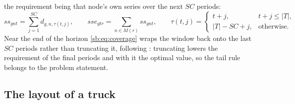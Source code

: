 the requirement being that node's own series over the next $SC$
periods:
\begin{equation}
ss_{gnt}=\sum_{j=1}^{SC} d_{g,n,\tau(t,j)},
\qquad
sse_{gtr}=\sum_{n\in M(r)} ss_{gnt},
\qquad
\tau(t,j)=\begin{cases} t+j, & t+j\le |T|,\\ |T|-SC+j, & \text{otherwise.}\end{cases}
\label{sb:eq:coverage}
\end{equation}
Near the end of the horizon \eqref{sb:eq:coverage} wraps the window
back onto the last $SC$ periods rather than truncating it, following
\autocite{Diaz-Madronero2014AChain}: truncating lowers the
requirement of the final periods and with it the optimal value, so the
tail rule belongs to the problem statement.

\subsection{The layout of a truck}

